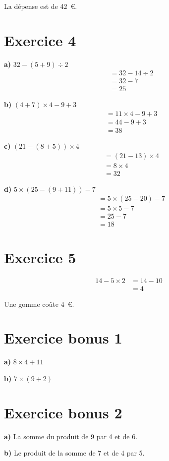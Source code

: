\documentclass[12pt]{extarticle}
\begin{document}
La dépense est de 42~€.

\section*{Exercice 4}

\textbf{a)} $32 - (5 + 9) \div 2$
\begin{align*}
&= 32 - 14 \div 2 \\
&= 32 - 7 \\
&= 25
\end{align*}

\textbf{b)} $(4 + 7) \times 4 - 9 + 3$
\begin{align*}
&= 11 \times 4 - 9 + 3 \\
&= 44 - 9 + 3 \\
&= 38
\end{align*}

\textbf{c)} $(21 - (8 + 5)) \times 4$
\begin{align*}
&= (21 - 13) \times 4 \\
&= 8 \times 4 \\
&= 32
\end{align*}

\textbf{d)} $5 \times (25 - (9 + 11)) - 7$
\begin{align*}
&= 5 \times (25 - 20) - 7 \\
&= 5 \times 5 - 7 \\
&= 25 - 7 \\
&= 18
\end{align*}

\section*{Exercice 5}
\begin{align*}
14 - 5 \times 2 &= 14 - 10 \\
                &= 4
\end{align*}

Une gomme coûte 4~€.

\section*{Exercice bonus 1}

\textbf{a)} $8 \times 4 + 11$

\textbf{b)} $7 \times (9 + 2)$

\section*{Exercice bonus 2}

\textbf{a)} La somme du produit de 9 par 4 et de 6.

\textbf{b)} Le produit de la somme de 7 et de 4 par 5.
\end{document}
